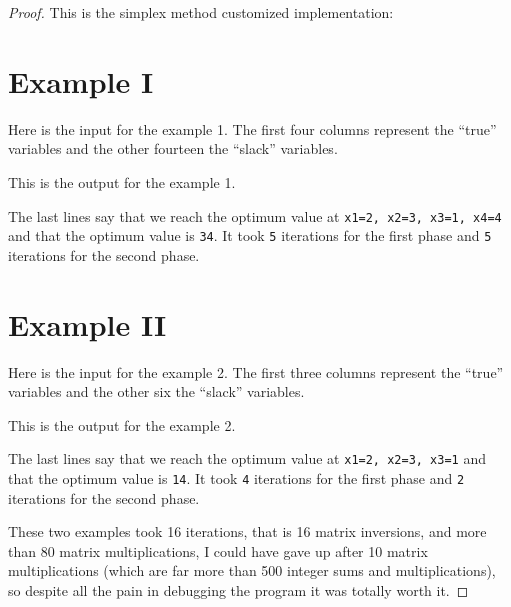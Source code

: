 \begin{proof}
    This is the simplex method customized implementation:
    \small
    
    \normalsize
    
    \newpage
    \section{Example I}

    
    Here is the input for the example 1. The first four columns represent the ``true'' variables and the other fourteen the ``slack'' variables.
    \small
    
    \normalsize
    \pn
    \pn
    
    This is the output for the example 1.
    \small
    
    \normalsize
    The last lines say that we reach the optimum value at \texttt{x1=2, x2=3, x3=1, x4=4} and that the optimum value is \texttt{34}.
    It took \texttt{5} iterations for the first phase and \texttt{5} iterations for the second phase.
    \newpage
    
    
    \section{Example II}
    Here is the input for the example 2. The first three columns represent the ``true'' variables and the other six the ``slack'' variables.
    \small
    
    \normalsize
    \pn
    \pn
       
    This is the output for the example 2.
    \small
    
    \normalsize
    The last lines say that we reach the optimum value at \texttt{x1=2, x2=3, x3=1} and that the optimum value is \texttt{14}.
    It took \texttt{4} iterations for the first phase and \texttt{2} iterations for the second phase.\pn
    
    These two examples took 16 iterations, that is 16 matrix inversions, and more than 80 matrix multiplications, I could have gave up
    after 10 matrix multiplications (which are far more than 500 integer sums and multiplications), so despite all the pain in debugging the 
    program it was totally worth it.
\end{proof}